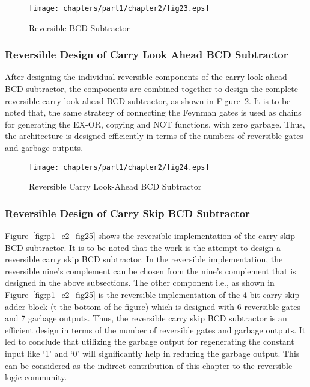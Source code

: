 \begin{figure}[!tbh]
	\centering
	\texttt{[image: chapters/part1/chapter2/fig23.eps]}
	\caption{Reversible BCD Subtractor}
	\label{fig:p1_c2_fig23}
\end{figure}

\subsubsection{Reversible Design of Carry Look Ahead BCD Subtractor}

After designing the individual reversible components of the carry look-ahead BCD subtractor, the components are combined together to design the complete reversible carry look-ahead BCD subtractor, as shown in Figure~\ref{fig:p1_c2_fig24}. It is to be noted that, the same strategy of connecting the Feynman gates is used as chains for generating the EX-OR, copying and NOT functions, with zero garbage. Thus, the architecture is designed efficiently in terms of the numbers of reversible gates and garbage outputs.

\begin{figure}[!tbh]
	\centering
	\texttt{[image: chapters/part1/chapter2/fig24.eps]}
	\caption{Reversible Carry Look-Ahead BCD Subtractor}
	\label{fig:p1_c2_fig24}
\end{figure}

\subsubsection{Reversible Design of Carry Skip BCD Subtractor}

\noindent Figure~\ref{fig:p1_c2_fig25} shows the reversible implementation of the carry skip BCD subtractor. It is to be noted that the work is the attempt to design a reversible carry skip BCD subtractor. In the reversible implementation, the reversible nine's complement can be chosen from the nine's complement that is designed in the above subsections. The other component i.e., as shown in Figure~\ref{fig:p1_c2_fig25} is the reversible implementation of the 4-bit carry skip adder block (t the bottom of he figure) which is designed with 6 reversible gates and 7 garbage outputs. Thus, the reversible carry skip BCD subtractor is an efficient design in terms of the number of reversible gates and garbage outputs. It led to conclude that utilizing the garbage output for regenerating the constant input like `1' and `0' will significantly help in reducing the garbage output. This can be considered as the indirect contribution of this chapter to the reversible logic community.


